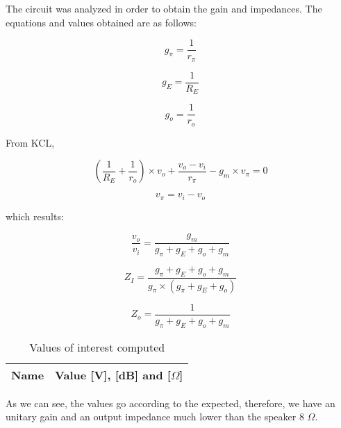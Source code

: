 The circuit was analyzed in order to obtain the gain and impedances. The equations and values obtained are as follows:

\begin{equation}
    g_\pi= \frac{1}{r_\pi}
\end{equation}

\begin{equation}
    g_E = \frac{1}{R_E}  
\end{equation}

\begin{equation}
    g_o = \frac{1}{r_o}    
\end{equation}

From KCL,

\begin{equation}
    (\frac{1}{R_E} + \frac{1}{r_o}) \times v_o + \frac{v_o - v_i}{r_\pi} - g_m \times v_\pi = 0 
\end{equation}

\begin{equation}
    v_\pi = v_i - v_o    
\end{equation}

which results:

\begin{equation}
    \frac{v_o}{v_i} = \frac{g_m}{g_\pi + g_E + g_o + g_m}
\end{equation}

\begin{equation}
    Z_I = \frac{g_\pi + g_E + g_o + g_m}{g_\pi \times (g_\pi + g_E + g_o)}
\end{equation}

\begin{equation}
    Z_o = \frac{1}{g_\pi + g_E + g_o + g_m}
\end{equation}

\vspace{0.3in}
\begin{table}[ht]
  \centering
  \begin{tabular}{|l|r|}
    \hline    
    {\bf Name} & {\bf Value [V], [dB] and [$\Omega$]} \\ \hline
    
  \end{tabular}
  \caption{Values of interest computed}
  \label{tab:op1f}
\end{table}

As we can see, the values go according to the expected, therefore, we have an unitary gain and an output impedance much lower than the speaker 8 $\Omega$.


